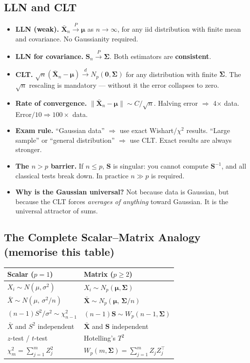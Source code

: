 \documentclass[12pt, a4paper]{article}
\begin{document}
\subsection*{LLN and CLT}
\begin{itemize}[itemsep=5pt]
  \item \textbf{LLN (weak).} $\bar{\mathbf{X}}_n \xrightarrow{P} \boldsymbol{\mu}$ as $n \to \infty$, for any iid distribution with finite mean and covariance. No Gaussianity required.
  \item \textbf{LLN for covariance.} $\mathbf{S}_n \xrightarrow{P} \boldsymbol{\Sigma}$. Both estimators are \textbf{consistent}.
  \item \textbf{CLT.} $\sqrt{n}(\bar{\mathbf{X}}_n - \boldsymbol{\mu}) \xrightarrow{d} N_p(\mathbf{0}, \boldsymbol{\Sigma})$ for any distribution with finite $\boldsymbol{\Sigma}$. The $\sqrt{n}$ rescaling is mandatory --- without it the error collapses to zero.
  \item \textbf{Rate of convergence.} $\|\bar{\mathbf{X}}_n - \boldsymbol{\mu}\| \sim C/\sqrt{n}$. Halving error $\Rightarrow$ 4$\times$ data. Error$/10 \Rightarrow 100\times$ data.
  \item \textbf{Exam rule.} ``Gaussian data'' $\Rightarrow$ use exact Wishart/$\chi^2$ results. ``Large sample'' or ``general distribution'' $\Rightarrow$ use CLT. Exact results are always stronger.
  \item \textbf{The $n > p$ barrier.} If $n \leq p$, $\mathbf{S}$ is singular: you cannot compute $\mathbf{S}^{-1}$, and all classical tests break down. In practice $n \gg p$ is required.
  \item \textbf{Why is the Gaussian universal?} Not because data is Gaussian, but because the CLT forces \textit{averages of anything} toward Gaussian. It is the universal attractor of sums.
\end{itemize}

\subsection*{The Complete Scalar--Matrix Analogy (memorise this table)}
\renewcommand{\arraystretch}{1.4}
\begin{center}
\begin{tabular}{ll}
\hline
\textbf{Scalar ($p=1$)} & \textbf{Matrix ($p \geq 2$)} \\
\hline
$X_i \sim N(\mu, \sigma^2)$ & $X_i \sim N_p(\boldsymbol{\mu}, \boldsymbol{\Sigma})$ \\
$\bar{X} \sim N(\mu,\, \sigma^2/n)$ & $\bar{\mathbf{X}} \sim N_p(\boldsymbol{\mu},\, \boldsymbol{\Sigma}/n)$ \\
$(n-1)S^2/\sigma^2 \sim \chi^2_{n-1}$ & $(n-1)\mathbf{S} \sim W_p(n-1, \boldsymbol{\Sigma})$ \\
$\bar{X}$ and $S^2$ independent & $\bar{\mathbf{X}}$ and $\mathbf{S}$ independent \\
$z$-test / $t$-test & Hotelling's $T^2$ \\
$\chi^2_m = \sum_{j=1}^m Z_j^2$ & $W_p(m,\boldsymbol{\Sigma}) = \sum_{j=1}^m Z_j Z_j^\top$ \\
\hline
\end{tabular}
\end{center}
\end{document}
